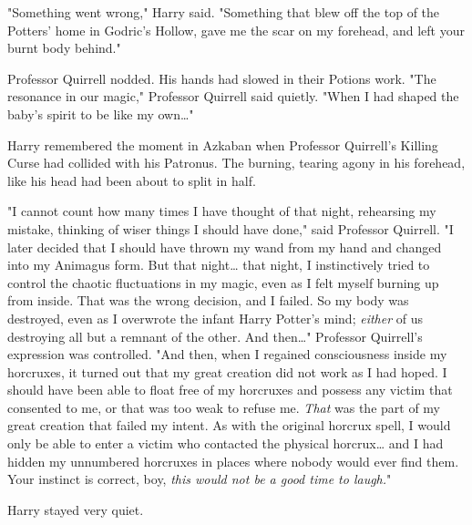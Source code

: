 "Something went wrong," Harry said. "Something that blew off the top of the
Potters' home in Godric's Hollow, gave me the scar on my forehead, and left
your burnt body behind."

Professor Quirrell nodded. His hands had slowed in their Potions work. "The
resonance in our magic," Professor Quirrell said quietly. "When I had shaped
the baby's spirit to be like my own{\ldots}"

Harry remembered the moment in Azkaban when Professor Quirrell's Killing Curse
had collided with his Patronus. The burning, tearing agony in his forehead,
like his head had been about to split in half.

"I cannot count how many times I have thought of that night, rehearsing my
mistake, thinking of wiser things I should have done," said Professor Quirrell.
"I later decided that I should have thrown my wand from my hand and changed
into my Animagus form. But that night{\ldots} that night, I instinctively tried
to control the chaotic fluctuations in my magic, even as I felt myself burning
up from inside. That was the wrong decision, and I failed. So my body was
destroyed, even as I overwrote the infant Harry Potter's mind; \emph{either} of
us destroying all but a remnant of the other. And then{\ldots}" Professor
Quirrell's expression was controlled. "And then, when I regained consciousness
inside my horcruxes, it turned out that my great creation did not work as I had
hoped. I should have been able to float free of my horcruxes and possess any
victim that consented to me, or that was too weak to refuse me. \emph{That} was
the part of my great creation that failed my intent. As with the original
horcrux spell, I would only be able to enter a victim who contacted the
physical horcrux{\ldots} and I had hidden my unnumbered horcruxes in places
where nobody would ever find them. Your instinct is correct, boy, \emph{this
would not be a good time to laugh.}"

Harry stayed very quiet.

